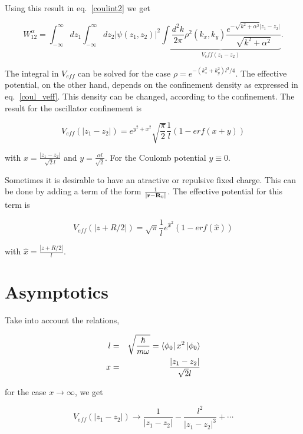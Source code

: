 \documentclass[a4paper,10pt]{article}
\begin{document}
Using this result in eq.~\ref{coulint2} we get

\begin{equation}\label{coul_veff}
W^{\alpha}_{12}=\int^\infty_{-\infty} dz_1 \int^\infty_{-\infty} dz_2 |\psi(z_1,z_2)|^2
\underbrace{\int \frac{d^2k}{2\pi} \rho^2(k_x,k_y) \frac{e^{-\sqrt{k^2+\alpha^2}|z_1
-z_2|}}{\sqrt{k^2+\alpha^2}}}_{V_eff(z_1-z_2)}.
\end{equation}

The integral in $V_{eff}$ can be solved for the case $\rho=e^{-(k_x^2+k^2_y)l^2/4}$. The
effective potential, on the other hand, depends on the confinement density as expressed
in eq.~\ref{coul_veff}. This density can be changed, according to the confinement. The
result for the oscillator confinement is

\begin{equation}
\label{V_eff}
V_{eff}(|z_1-z_2|)= e^{y^2+x^2}\sqrt{\frac{\pi}{2}}\frac{1}{l}\left(1-erf(x+y)\right)
\end{equation}

\noindent with $x=\frac{|z_1-z_2|}{\sqrt{2}l}$ and $y=\frac{\alpha l}{\sqrt{2}}$. For the Coulomb potential $y\equiv 0$.

Sometimes it is desirable to have an atractive or repulsive fixed charge. This can be done by adding a term of the form $\frac{1}{|\mathbf{r}-\mathbf{R}_0|}$. The effective potential
for this term is

\begin{equation}
V_{eff}(|z+R/2|) = \sqrt{\pi}\frac{1}{l}e^{\hat{x}^2}(1-erf(\hat{x}))
\end{equation}

\noindent with $\hat{x}=\frac{|z+R/2|}{l}$.

\section*{Asymptotics}

Take into account the relations,

\begin{eqnarray}
l&=&\sqrt{\frac{\hbar}{m \omega}}=\left\langle \phi_{0} \right| x^2 \left| \phi_{0} \right\rangle \\
x&=&\frac{|z_1-z_2|}{\sqrt{2}l}
\end{eqnarray}

\noindent for the case $x\rightarrow \infty$, we get

\begin{equation}
V_{eff}(|z_1-z_2|)\rightarrow \frac{1}{|z_1-z_2|} - \frac{l^2}{|z_1-z_2|^3} + \cdots
\end{equation}
\end{document}
